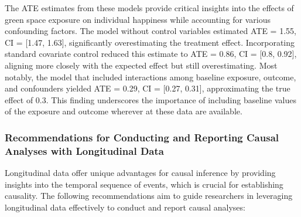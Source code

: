 \documentclass[
  singlecolumn]{article}
\begin{document}
The ATE estimates from these models provide critical insights into the
effects of green space exposure on individual happiness while accounting
for various confounding factors. The model without control variables
estimated ATE = 1.55, CI = {[}1.47, 1.63{]}, significantly
overestimating the treatment effect. Incorporating standard covariate
control reduced this estimate to ATE = 0.86, CI = {[}0.8, 0.92{]},
aligning more closely with the expected effect but still overestimating.
Most notably, the model that included interactions among baseline
exposure, outcome, and confounders yielded ATE = 0.29, CI = {[}0.27,
0.31{]}, approximating the true effect of 0.3. This finding underscores
the importance of including baseline values of the exposure and outcome
wherever at these data are available.

\subsubsection{Recommendations for Conducting and Reporting Causal
Analyses with Longitudinal
Data}\label{recommendations-for-conducting-and-reporting-causal-analyses-with-longitudinal-data}

Longitudinal data offer unique advantages for causal inference by
providing insights into the temporal sequence of events, which is
crucial for establishing causality. The following recommendations aim to
guide researchers in leveraging longitudinal data effectively to conduct
and report causal analyses:
\end{document}
